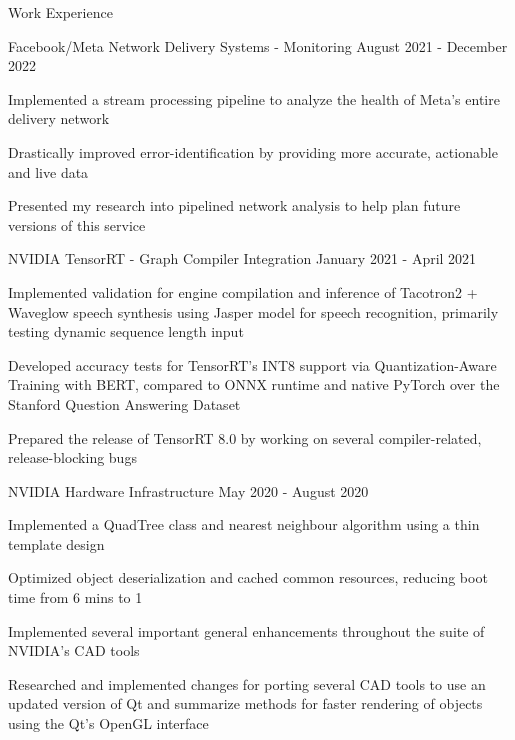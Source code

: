 \documentclass{resume} %
\begin{document}
\begin{rSection}{Work Experience}
    \begin{workexperience}
        {Facebook/Meta}
        {Network Delivery Systems - Monitoring}
        {August 2021 - December 2022}
        {
            \item Implemented a stream processing pipeline to analyze the health of Meta's entire delivery network
            \item Drastically improved error-identification by providing more accurate, actionable and live data
            \item Presented my research into pipelined network analysis to help plan future versions of this service
        }
    \end{workexperience}

    \begin{workexperience}
        {NVIDIA}
        {TensorRT - Graph Compiler Integration}
        {January 2021 - April 2021}
        {
            \item Implemented validation for engine compilation and inference of Tacotron2 + Waveglow speech synthesis using Jasper model for speech recognition, primarily testing dynamic sequence length input
            \item Developed accuracy tests for TensorRT's INT8 support via Quantization-Aware Training with BERT, compared to ONNX runtime and native PyTorch over the Stanford Question Answering Dataset
            \item Prepared the release of TensorRT 8.0 by working on several compiler-related, release-blocking bugs
        }
    \end{workexperience}
    \begin{workexperience}
        {NVIDIA}
        {Hardware Infrastructure}
        {May 2020 - August 2020}
        {
            \item Implemented a QuadTree class and nearest neighbour algorithm using a thin template design
            \item Optimized object deserialization and cached common resources, reducing boot time from 6 mins to 1
            \item Implemented several important general enhancements throughout the suite of NVIDIA's CAD tools
            \item Researched and implemented changes for porting several CAD tools to use an updated version of Qt and summarize methods for faster rendering of objects using the Qt's OpenGL interface
        }
    \end{workexperience}
    

\end{rSection}
\end{document}
